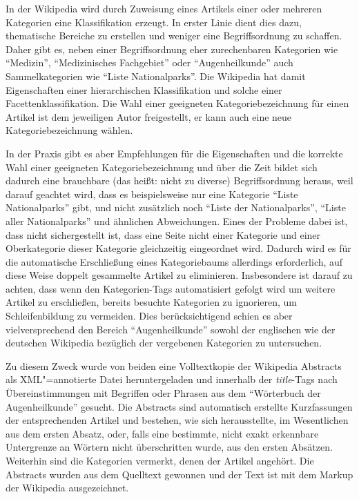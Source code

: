 \documentclass[pagesize,paper=A4,DIV=calc,fontsize=12pt,draft=false]{scrreprt}
\begin{document}
In der Wikipedia wird durch Zuweisung eines Artikels einer oder mehreren Kategorien eine Klassifikation erzeugt. 
In erster Linie dient dies dazu, thematische Bereiche zu erstellen und weniger eine Begriffsordnung zu schaffen. 
Daher gibt es, neben einer Begriffsordnung eher zurechenbaren Kategorien wie \enquote{Medizin}, \enquote{Medizinisches Fachgebiet} oder \enquote{Augenheilkunde} auch Sammelkategorien wie \enquote{Liste Nationalparks}. 
Die Wikipedia hat damit Eigenschaften einer hierarchischen Klassifikation und solche einer Facettenklassifikation. 
Die Wahl einer geeigneten Kategoriebezeichnung für einen Artikel ist dem jeweiligen Autor freigestellt, er kann auch eine neue Kategoriebezeichnung wählen. 

In der Praxis gibt es aber Empfehlungen für die Eigenschaften und die korrekte Wahl einer geeigneten Kategoriebezeichnung und über die Zeit bildet sich dadurch eine brauchbare (das heißt: nicht zu diverse) Begriffsordnung heraus, weil darauf geachtet wird, dass es beispielsweise nur eine Kategorie \enquote{Liste Nationalparks} gibt, und nicht zusätzlich noch \enquote{Liste der Nationalparks}, \enquote{Liste aller Nationalparks} und ähnlichen Abweichungen. 
Eines der Probleme dabei ist, dass nicht sichergestellt ist, dass eine Seite nicht einer Kategorie und einer Oberkategorie dieser Kategorie gleichzeitig eingeordnet wird. 
Dadurch wird es für die automatische Erschließung eines Kategoriebaums allerdings erforderlich, auf diese Weise doppelt gesammelte Artikel zu eliminieren. 
Insbesondere ist darauf zu achten, dass wenn den Kategorien-Tags automatisiert gefolgt wird um weitere Artikel zu erschließen, bereits besuchte Kategorien zu ignorieren, um Schleifenbildung zu vermeiden. 
Dies berücksichtigend schien es aber vielversprechend den Bereich \enquote{Augenheilkunde} sowohl der englischen wie der deutschen Wikipedia bezüglich der vergebenen Kategorien zu untersuchen. 

Zu diesem Zweck wurde von beiden eine Volltextkopie der Wikipedia Abstracts als XML"=annotierte Datei heruntergeladen und innerhalb der \textit{title}-Tags nach Übereinstimmungen mit Begriffen oder Phrasen aus dem \enquote{Wörterbuch der Augenheilkunde} gesucht. 
Die Abstracts sind automatisch erstellte Kurzfassungen der entsprechenden Artikel und bestehen, wie sich herausstellte, im Wesentlichen aus dem ersten Absatz, oder, falls eine bestimmte, nicht exakt erkennbare Untergrenze an Wörtern nicht überschritten wurde, aus den ersten Absätzen. 
Weiterhin sind die Kategorien vermerkt, denen der Artikel angehört. 
Die Abstracts wurden aus dem Quelltext gewonnen und der Text ist mit dem Markup der Wikipedia ausgezeichnet. 
\end{document}
